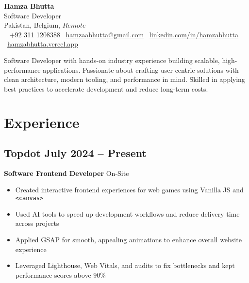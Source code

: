 \documentclass[11pt]{article}
\makeatletter
\newcommand{\resumeHeader}[6]{ %
    \begin{center}
        \vspace*{10pt}
        {\Huge\bfseries\color{headercolor} #1} \\[8pt]
      {\large\color{headercolor} Software Developer} \\[4pt]
{\small\color{headercolor} #6} \\[8pt]
        {\normalsize\color{headercolor}
            \faPhone~ {+92 311 1208388} {}
            \faEnvelope~\href{mailto:hamzaabhutta@gmail.com}{hamzaabhutta@gmail.com}  {}
            \faLinkedin~\href{https://www.linkedin.com/in/hamzabhutta}{linkedin.com/in/hamzabhutta} {}
            \faGlobe~\href{https://hamzabhutta.vercel.app/}{hamzabhutta.vercel.app}
        } \\[10pt]
        \parbox{0.9\textwidth}{\centering\small\color{black}#5} %
        \vspace{10pt}
    \end{center}
}
\makeatother
\begin{document}
\pagestyle{empty} %
\RaggedRight %

\resumeHeader{Hamza Bhutta}{}{}{}{
Software Developer with hands-on industry experience building scalable, high-performance applications. Passionate about crafting user-centric solutions with clean architecture, modern tooling, and performance in mind. Skilled in applying best practices to accelerate development and reduce long-term costs.
}
{Pakistan, Belgium, \(Remote\)}


\section{Experience}
\subsection{\texorpdfstring{Topdot \hfill July 2024 -- Present}{Topdot, July 2024 -- Present}}  
\textbf{Software Frontend Developer} \hfill On-Site  
\begin{itemize}
\item Created interactive frontend experiences for web games using Vanilla JS and \texttt{<canvas>}
\item Used AI tools to speed up development workflows and reduce delivery time across projects  
\item Applied GSAP for smooth, appealing animations to enhance overall website experience  
\item Leveraged Lighthouse, Web Vitals, and audits to fix bottlenecks and kept performance scores above 90\%  
\end{itemize}
\end{document}
